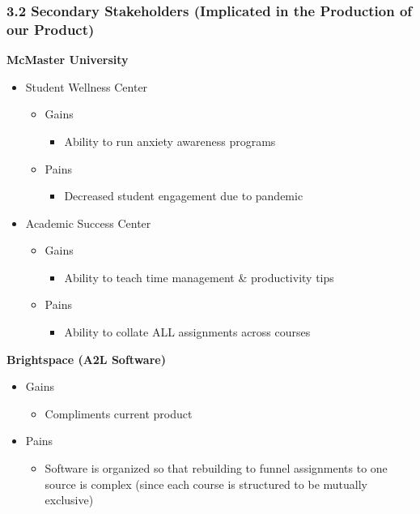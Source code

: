 \documentclass[11pt, oneside]{article}   	%
\begin{document}
\subsubsection*{3.2 Secondary Stakeholders (Implicated in the Production of our Product)}

\textbf{McMaster University}
\begin{itemize}
\item Student Wellness Center
\begin{itemize}
\item Gains
\begin{itemize}
\item Ability to run anxiety awareness programs
\end{itemize}

\item Pains
\begin{itemize}
\item Decreased student engagement due to pandemic
\end{itemize}
\end{itemize}

\item Academic Success Center
\begin{itemize}
\item Gains
\begin{itemize}
\item Ability to teach time management \& productivity tips
\end{itemize}

\item Pains
\begin{itemize}
\item Ability to collate ALL assignments across courses 
\end{itemize}
\end{itemize}
\end{itemize}

\textbf{Brightspace (A2L Software)}
\begin{itemize}
\item Gains
\begin{itemize}
\item Compliments current product
\end{itemize}

\item Pains
\begin{itemize}
\item Software is organized so that rebuilding to funnel assignments to one source is complex (since each course is structured to be mutually exclusive)
\end{itemize}
\end{itemize}
\end{document}
